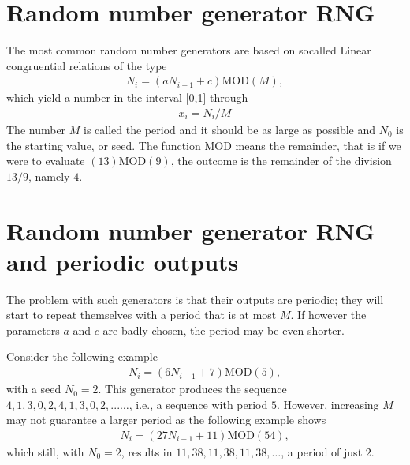 \documentclass[letterpaper,10pt,english]{sphinxmanual}
\begin{document}
\section{Random number generator RNG}
\label{\detokenize{chapter3:random-number-generator-rng}}
The most common random number generators are based on so\sphinxhyphen{}called
Linear congruential relations of the type
\begin{equation*}
\begin{split}
N_i=(aN_{i-1}+c) \mathrm{MOD} (M),
\end{split}
\end{equation*}
which yield a number in the interval {[}0,1{]} through
\begin{equation*}
\begin{split}
x_i=N_i/M
\end{split}
\end{equation*}
The number
\(M\) is called the period and it should be as large as possible
and
\(N_0\) is the starting value, or seed. The function \(\mathrm{MOD}\) means the remainder,
that is if we were to evaluate \((13)\mathrm{MOD}(9)\), the outcome is the remainder
of the division \(13/9\), namely \(4\).


\section{Random number generator RNG and periodic outputs}
\label{\detokenize{chapter3:random-number-generator-rng-and-periodic-outputs}}
The problem with such generators is that their outputs are periodic;
they
will start to repeat themselves with a period that is at most \(M\). If however
the parameters \(a\) and \(c\) are badly chosen, the period may be even shorter.

Consider the following example
\begin{equation*}
\begin{split}
N_i=(6N_{i-1}+7) \mathrm{MOD} (5),
\end{split}
\end{equation*}
with a seed \(N_0=2\). This generator produces the sequence
\(4,1,3,0,2,4,1,3,0,2,...\dots\), i.e., a sequence with period \(5\).
However, increasing \(M\) may not guarantee a larger period as the following
example shows
\begin{equation*}
\begin{split}
N_i=(27N_{i-1}+11) \mathrm{MOD} (54),
\end{split}
\end{equation*}
which still, with \(N_0=2\), results in \(11,38,11,38,11,38,\dots\), a period of
just \(2\).
\end{document}
